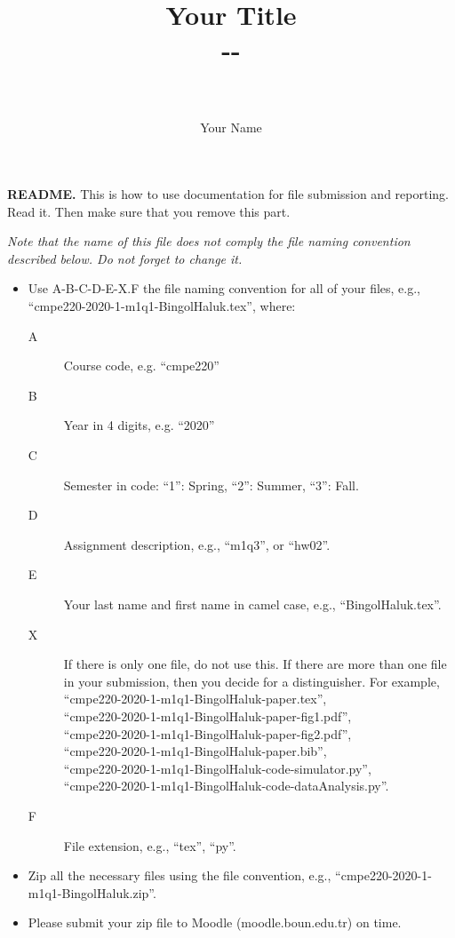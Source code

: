 \documentclass[11pt,a4,twocolumn]{article}
\title{
	Your Title\\
	{\small 	
		\hbCourse-\hbWhat-\hbYou\\
		\hbTimeStamp\\
	}
}
\author{Your Name}
\date{}
\begin{document}
\maketitle




{\color{red} %
	\textbf{README.}
	This is how to use documentation for file submission and reporting.
	Read it.
	Then make sure that you remove this part.

	\emph{
		Note that the name of this file does not comply 
		the file naming convention described below. 
		Do not forget to change it.
	}
	
	\begin{itemize}
		
		\item 
		Use A-B-C-D-E-X.F the file naming convention for all of your files,
		e.g., ``cmpe220-2020-1-m1q1-BingolHaluk.tex'',
		where:
		\begin{description}
			
			\item[A]
			Course code, e.g. ``cmpe220'' 
			
			\item[B]
			Year in 4 digits, e.g. ``2020'' 
			
			\item[C] 
			Semester in code: ``1'': Spring, ``2'': Summer, ``3'': Fall.
			
			\item[D] 
			Assignment description, e.g., ``m1q3'', or ``hw02''.
			
			\item[E]
			Your last name and first name in camel case, e.g., ``BingolHaluk.tex''.
			
			\item[X]
			If there is only one file, do not use this.
			If there are more than one file in your submission, 
			then you decide for a distinguisher.
			For example,\\
			``cmpe220-2020-1-m1q1-BingolHaluk-paper.tex'',\\
			``cmpe220-2020-1-m1q1-BingolHaluk-paper-fig1.pdf'',\\
			``cmpe220-2020-1-m1q1-BingolHaluk-paper-fig2.pdf'',\\
			``cmpe220-2020-1-m1q1-BingolHaluk-paper.bib'',\\
			``cmpe220-2020-1-m1q1-BingolHaluk-code-simulator.py'',\\
			``cmpe220-2020-1-m1q1-BingolHaluk-code-dataAnalysis.py''.
			
			\item[F]
			File extension, e.g., ``tex'', ``py''.
		\end{description}
		
		\item 
		Zip all the necessary files using the file convention,
		e.g., ``cmpe220-2020-1-m1q1-BingolHaluk.zip''.
		
		\item 
		Please submit your zip file to Moodle (moodle.boun.edu.tr) on time.
		
	\end{itemize}
} %
\end{document}
